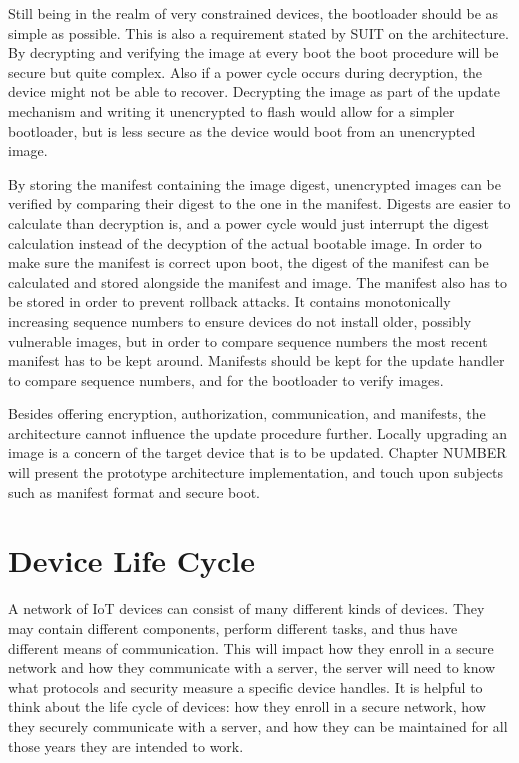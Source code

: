\documentclass[0-thesis.tex]{subfiles}
\begin{document}
Still being in the realm of very constrained devices, the bootloader should be as simple
as possible. This is also a requirement stated by SUIT on the architecture. By decrypting
and verifying the image at every boot the boot procedure will be secure but
quite complex. Also if a power cycle occurs during decryption, the device might not be
able to recover. Decrypting the image as part of the update mechanism and writing it
unencrypted to flash would allow for a simpler bootloader, but is less secure as the
device would boot from an unencrypted image.

By storing the manifest containing the image digest, unencrypted images can be verified by
comparing their digest to the one in the manifest. Digests are easier to calculate than
decryption is, and a power cycle would just interrupt the digest calculation instead of
the decyption of the actual bootable image. In order to make sure the manifest is correct
upon boot, the digest of the manifest can be calculated and stored alongside the manifest
and image. The manifest also has to be stored in order to prevent rollback attacks. It
contains monotonically increasing sequence numbers to ensure devices do not install older,
possibly vulnerable images, but in order to compare sequence numbers the most recent
manifest has to be kept around. Manifests should be kept for the update handler to compare
sequence numbers, and for the bootloader to verify images.

Besides offering encryption, authorization, communication, and manifests, the architecture
cannot influence the update procedure further. Locally upgrading an image is a concern of
the target device that is to be updated. Chapter NUMBER will present the prototype
architecture implementation, and touch upon subjects such as manifest format and secure
boot.

\section{Device Life Cycle}
\label{sec:device-lifecycle}
A network of IoT devices can consist of many different kinds of devices. They may contain
different components, perform different tasks, and thus have different means of
communication. This will impact how they enroll in a secure network and how they
communicate with a server, the server will need to know what protocols and security
measure a specific device handles. It is helpful to think about the life cycle of devices:
how they enroll in a secure network, how they securely communicate with a server, and how
they can be maintained for all those years they are intended to work.
\end{document}

